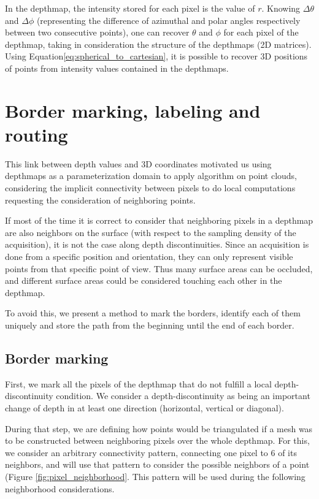 \documentclass[11pt,fleqn]{book} %
\begin{document}
In the depthmap, the intensity stored for each pixel is the value of $r$. Knowing $\Delta\theta$ and $\Delta\phi$ (representing the difference of azimuthal and polar angles respectively between two consecutive points), one can recover $\theta$ and $\phi$ for each pixel of the depthmap, taking in consideration the structure of the depthmaps (2D matrices). 
Using Equation\eqref{eq:spherical_to_cartesian}, it is possible to recover 3D positions of points from intensity values contained in the depthmaps.

\section{Border marking, labeling and routing}
\label{sec:border_marking}

This link between depth values and 3D coordinates motivated us using depthmaps as a parameterization domain to apply algorithm on point clouds, considering the implicit connectivity between pixels to do local computations requesting the consideration of neighboring points.

If most of the time it is correct to consider that neighboring pixels in a depthmap are also neighbors on the surface (with respect to the sampling density of the acquisition), it is not the case along depth discontinuities.
Since an acquisition is done from a specific position and orientation, they can only represent visible points from that specific point of view. Thus many surface areas can be occluded, and different surface areas could be considered touching each other in the depthmap.

To avoid this, we present a method to mark the borders, identify each of them uniquely and store the path from the beginning until the end of each border.

\subsection{Border marking}
First, we mark all the pixels of the depthmap that do not fulfill a local depth-discontinuity condition. We consider a depth-discontinuity as being an important change of depth in at least one direction (horizontal, vertical or diagonal).

During that step, we are defining how points would be triangulated if a mesh was to be constructed between neighboring pixels over the whole depthmap. For this, we consider an arbitrary connectivity pattern, connecting one pixel to 6 of its neighbors, and will use that pattern to consider the possible neighbors of a point (Figure \ref{fig:pixel_neighborhood}. This pattern will be used during the following neighborhood considerations.
\end{document}
